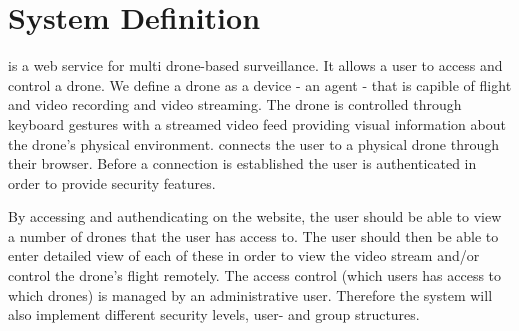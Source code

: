\section{System Definition}
\projectname{} is a web service for multi drone-based surveillance. 
It allows a user to access and control a drone. 
We define a drone as a device - an agent - that is capible of flight and video recording and video streaming. 
The drone is controlled through keyboard gestures with a streamed video feed providing visual information about the drone's physical environment. \projectname{} connects the user to a physical drone through their browser. 
Before a connection is established the user is authenticated in order to provide security features.

By accessing and authendicating on the website, the user should be able to view a number of drones that the user has access to.
The user should then be able to enter detailed view of each of these in order to view the video stream and/or control the drone's flight remotely. 
The access control (which users has access to which drones) is managed by an administrative user.
Therefore the system will also implement different security levels, user- and group structures. 
